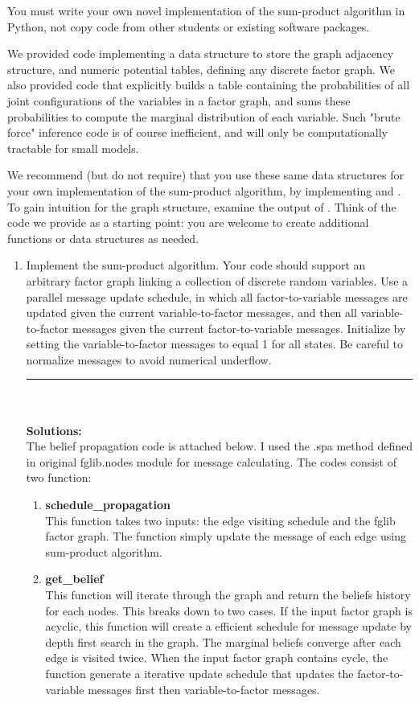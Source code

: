 \documentclass{article}
\begin{document}
\begin{enumerate}
You must write your own novel implementation of the sum-product algorithm in Python, not copy code from other students or existing software packages.

We  provided code implementing a data structure to store the graph adjacency structure, and numeric potential tables, defining any discrete factor graph. We also provided code that explicitly builds a table containing the probabilities of all joint configurations of the variables in a factor graph, and sums these probabilities to compute the marginal
distribution of each variable. Such "brute force" inference code is of course inefficient, and will only be computationally tractable for small models.

We recommend (but do not require) that you use these same data structures for your own implementation of the sum-product algorithm, by implementing 
and . To gain intuition for the graph structure, examine the output of . Think of the code we provide as a starting point: you are welcome to create additional functions or data structures as needed. 

\begin{enumerate}
\item Implement the sum-product algorithm. Your code should support an arbitrary factor graph linking a collection of discrete random variables. Use a parallel message update schedule,
in which all factor-to-variable messages are updated given the current variable-to-factor messages, and then all variable-to-factor messages given the current factor-to-variable
messages. Initialize by setting the variable-to-factor messages to equal 1 for all states.
Be careful to normalize messages to avoid numerical underflow.
\\
\noindent\rule{14cm}{2pt}
\\
\\
\textbf{Solutions:}
\\
The belief propagation code is attached below. I used the .spa method defined in original fglib.nodes module for message calculating. The codes consist of two function:
\begin{enumerate}
\item \textbf{schedule\_propagation}\\
This function takes two inputs: the edge visiting schedule and the fglib factor graph. The function simply update the message of each edge using sum-product algorithm.
\item \textbf{get\_belief}\\
This function will iterate through the graph and return the beliefs history for each nodes. This breaks down to two cases. If the input factor graph is acyclic, this function will create a efficient schedule for message update by depth first search in the graph. The marginal beliefs  converge after each edge is visited twice. When the input factor graph contains cycle, the function generate a iterative update schedule that updates the factor-to-variable messages first then variable-to-factor messages.


\end{enumerate}
\end{enumerate}
\end{enumerate}
\end{document}
